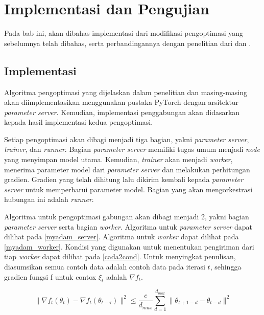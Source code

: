 \chapter{Implementasi dan Pengujian}

Pada bab ini, akan dibahas implementasi dari modifikasi pengoptimasi yang sebelumnya telah dibahas, serta perbandingannya dengan penelitian dari \textcite{Chen2022Efficient} dan \textcite{Chen2021CADA}.

\section{Implementasi}
Algoritma pengoptimasi yang dijelaskan dalam penelitian \textcite{Chen2022Efficient} dan \textcite{Chen2021CADA} masing-masing akan diimplementasikan menggunakan pustaka PyTorch dengan arsitektur \emph{parameter server}. Kemudian, implementasi penggabungan akan didasarkan kepada hasil implementasi kedua pengoptimasi.

Setiap pengoptimasi akan dibagi menjadi tiga bagian, yakni \emph{parameter server}, \emph{trainer}, dan \emph{runner}. Bagian \emph{parameter server} memiliki tugas umum menjadi \emph{node} yang menyimpan model utama. Kemudian, \emph{trainer} akan menjadi \emph{worker}, menerima parameter model dari \emph{parameter server} dan melakukan perhitungan gradien. Gradien yang telah dihitung lalu dikirim kembali kepada \emph{parameter server} untuk memperbarui parameter model. Bagian yang akan mengorkestrasi hubungan ini adalah \emph{runner}.

Algoritma untuk pengoptimasi gabungan akan dibagi menjadi 2, yakni bagian \textit{parameter server} serta bagian \textit{worker}. Algoritma untuk \textit{parameter server} dapat dilihat pada \autoref{myadam_server}. Algoritma untuk \textit{worker} dapat dilihat pada \autoref{myadam_worker}. Kondisi yang digunakan untuk menentukan pengiriman dari tiap \textit{worker} dapat dilihat pada \autoref{cada2cond}. Untuk menyingkat penulisan, diasumsikan semua contoh data adalah contoh data pada iterasi $t$, sehingga gradien fungsi f untuk contox $\xi_t$ adalah $\nabla f_t$.

\begin{equation}
  \label{cada2cond}
  \|\nabla f_t(\theta_t) - \nabla f_t(\theta_{t-\tau})\|^2 \leq \frac{c}{d_{max}} \sum_{d=1}^{d_{max}} \|\theta_{t+1-d} - \theta_{t-d}\|^2
\end{equation}

